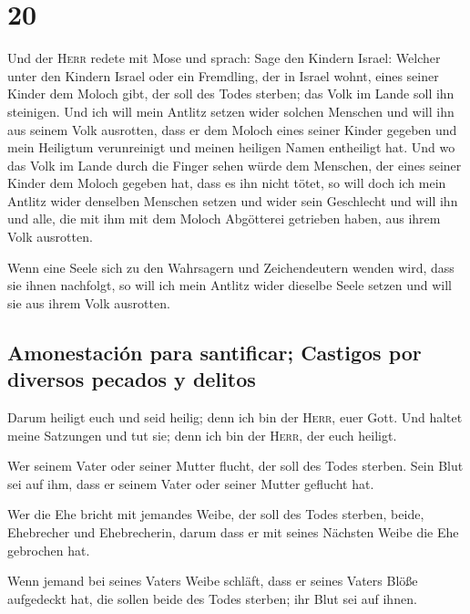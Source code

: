 \hypertarget{section-19}{%
\section{20}\label{section-19}}

 Und der \textsc{Herr} redete mit Mose und sprach:
 Sage den Kindern Israel: Welcher unter den Kindern Israel
oder ein Fremdling, der in Israel wohnt, eines seiner Kinder dem Moloch
gibt, der soll des Todes sterben; das Volk im Lande soll ihn steinigen.
 Und ich will mein Antlitz setzen wider solchen Menschen
und will ihn aus seinem Volk ausrotten, dass er dem Moloch eines seiner
Kinder gegeben und mein Heiligtum verunreinigt und meinen heiligen Namen
entheiligt hat.  Und wo das Volk im Lande durch die Finger
sehen würde dem Menschen, der eines seiner Kinder dem Moloch gegeben
hat, dass es ihn nicht tötet,  so will doch ich mein
Antlitz wider denselben Menschen setzen und wider sein Geschlecht und
will ihn und alle, die mit ihm mit dem Moloch Abgötterei getrieben
haben, aus ihrem Volk ausrotten.

 Wenn eine Seele sich zu den Wahrsagern und Zeichendeutern
wenden wird, dass sie ihnen nachfolgt, so will ich mein Antlitz wider
dieselbe Seele setzen und will sie aus ihrem Volk ausrotten.

\hypertarget{amonestaciuxf3n-para-santificar-castigos-por-diversos-pecados-y-delitos}{%
\subsection{Amonestación para santificar; Castigos por diversos pecados
y
delitos}\label{amonestaciuxf3n-para-santificar-castigos-por-diversos-pecados-y-delitos}}

 Darum heiligt euch und seid heilig; denn ich bin der
\textsc{Herr}, euer Gott.  Und haltet meine Satzungen und
tut sie; denn ich bin der \textsc{Herr}, der euch heiligt.

 Wer seinem Vater oder seiner Mutter flucht, der soll des
Todes sterben. Sein Blut sei auf ihm, dass er seinem Vater oder seiner
Mutter geflucht hat.

 Wer die Ehe bricht mit jemandes Weibe, der soll des
Todes sterben, beide, Ehebrecher und Ehebrecherin, darum dass er mit
seines Nächsten Weibe die Ehe gebrochen hat.

 Wenn jemand bei seines Vaters Weibe schläft, dass er
seines Vaters Blöße aufgedeckt hat, die sollen beide des Todes sterben;
ihr Blut sei auf ihnen.

